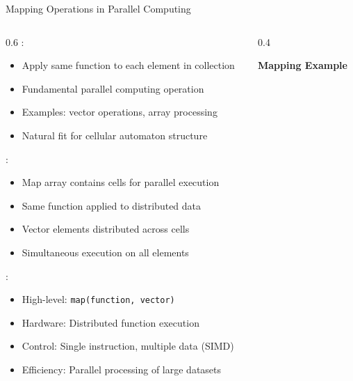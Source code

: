 \begin{frame}{Mapping Operations in Parallel Computing}
\begin{columns}
\begin{column}{0.6\textwidth}
:
\begin{itemize}
\item Apply same function to each element in collection
\item Fundamental parallel computing operation
\item Examples: vector operations, array processing
\item Natural fit for cellular automaton structure
\end{itemize}

\vspace{0.3cm}
:
\begin{itemize}
\item Map array contains cells for parallel execution
\item Same function applied to distributed data
\item Vector elements distributed across cells
\item Simultaneous execution on all elements
\end{itemize}

\vspace{0.3cm}
:
\begin{itemize}
\item High-level: \texttt{map(function, vector)}
\item Hardware: Distributed function execution
\item Control: Single instruction, multiple data (SIMD)
\item Efficiency: Parallel processing of large datasets
\end{itemize}
\end{column}
\begin{column}{0.4\textwidth}
\begin{center}
\textbf{Mapping Example}
\vspace{0.3cm}

\end{center}
\end{column}
\end{columns}
\end{frame}

